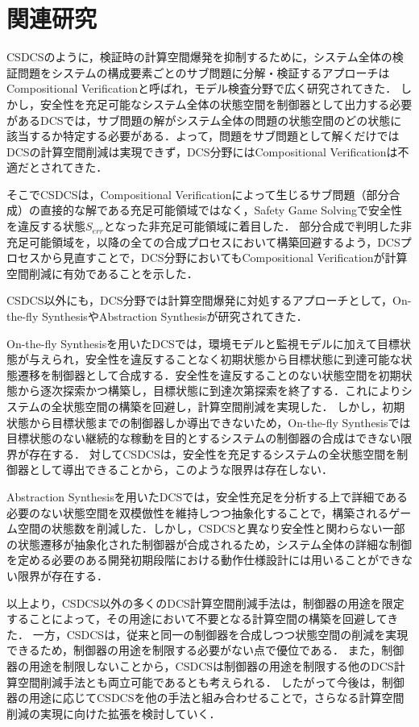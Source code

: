 \section{関連研究}
\label{section:relatedwork}
CSDCSのように，検証時の計算空間爆発を抑制するために，システム全体の検証問題をシステムの構成要素ごとのサブ問題に分解・検証するアプローチはCompositional Verificationと呼ばれ，モデル検査分野で広く研究されてきた\cite{paper:CompositionalVerification_1}\cite{paper:CompositionalVerification_2}\cite{paper:CompositionalVerification_3}\cite{paper:CompositionalVerification_4}\cite{paper:CompositionalVerification_5}\cite{paper:CompositionalVerification_6}\cite{paper:CompositionalVerification_7}\cite{paper:CompositionalVerification_8}．
しかし，安全性を充足可能なシステム全体の状態空間を制御器として出力する必要があるDCSでは，サブ問題の解がシステム全体の問題の状態空間のどの状態に該当するか特定する必要がある．よって，問題をサブ問題として解くだけではDCSの計算空間削減は実現できず，DCS分野にはCompositional Verificationは不適だとされてきた．

そこでCSDCSは，Compositional Verificationによって生じるサブ問題（部分合成）の直接的な解である充足可能領域ではなく，Safety Game Solvingで安全性を違反する状態$S_{err}$となった非充足可能領域に着目した．
部分合成で判明した非充足可能領域を，以降の全ての合成プロセスにおいて構築回避するよう，DCSプロセスから見直すことで，DCS分野においてもCompositional Verificationが計算空間削減に有効であることを示した．

CSDCS以外にも，DCS分野では計算空間爆発に対処するアプローチとして，On-the-fly SynthesisやAbstraction Synthesisが研究されてきた．

On-the-fly Synthesisを用いたDCS\cite{paper:On-the-flySyntehsis_1}\cite{paper:On-the-flySyntehsis_2}\cite{paper:On-the-flySyntehsis_3}\cite{paper:On-the-flySyntehsis_4}では，環境モデルと監視モデルに加えて目標状態が与えられ，安全性を違反することなく初期状態から目標状態に到達可能な状態遷移を制御器として合成する．安全性を違反することのない状態空間を初期状態から逐次探索かつ構築し，目標状態に到達次第探索を終了する．これによりシステムの全状態空間の構築を回避し，計算空間削減を実現した．
しかし，初期状態から目標状態までの制御器しか導出できないため，On-the-fly Synthesisでは目標状態のない継続的な稼動を目的とするシステムの制御器の合成はできない限界が存在する．
対してCSDCSは，安全性を充足するシステムの全状態空間を制御器として導出できることから，このような限界は存在しない．

Abstraction Synthesisを用いたDCS\cite{paper:SynthesisAbstraction_1}\cite{paper:SynthesisAbstraction_2}\cite{aizawa:IEICEJ2020}では，安全性充足を分析する上で詳細である必要のない状態空間を双模倣性を維持しつつ抽象化することで，構築されるゲーム空間の状態数を削減した．しかし，CSDCSと異なり安全性と関わらない一部の状態遷移が抽象化された制御器が合成されるため，システム全体の詳細な制御を定める必要のある開発初期段階における動作仕様設計には用いることができない限界が存在する．

以上より，CSDCS以外の多くのDCS計算空間削減手法は，制御器の用途を限定することによって，その用途において不要となる計算空間の構築を回避してきた．
一方，CSDCSは，従来と同一の制御器を合成しつつ状態空間の削減を実現できるため，制御器の用途を制限する必要がない点で優位である．
また，制御器の用途を制限しないことから，CSDCSは制御器の用途を制限する他のDCS計算空間削減手法とも両立可能であるとも考えられる．
したがって今後は，制御器の用途に応じてCSDCSを他の手法と組み合わせることで，さらなる計算空間削減の実現に向けた拡張を検討していく．